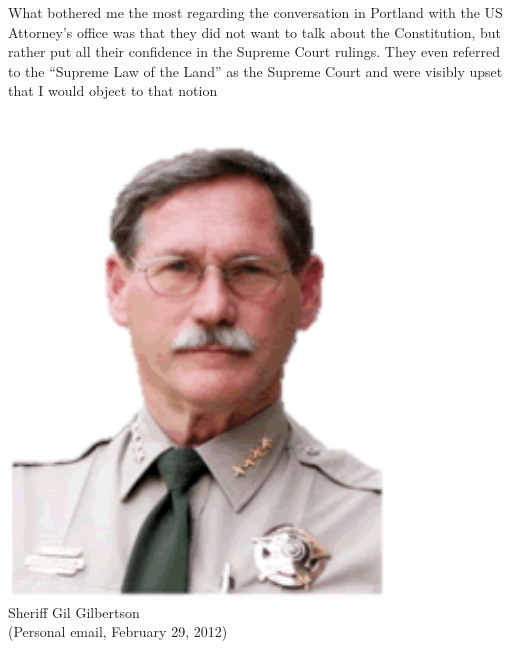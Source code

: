 \documentclass{beamer}
\begin{document}
\begin{frame}
    \begin{columns}[onlytextwidth]
What bothered me the most regarding the conversation in Portland with the US
Attorney's office was that they did not want to talk about the Constitution,
but rather put all their confidence in the Supreme Court rulings. They even
referred to the ``Supreme Law of the Land'' as the Supreme Court and were visibly
upset that I would object to that notion
            \centering
            \includegraphics[width=0.75\textwidth]{img/gil-gilbertson.png}
            \\ Sheriff Gil Gilbertson
            \\ (Personal email, February 29, 2012)
    \end{columns}
\end{frame}
\end{document}
